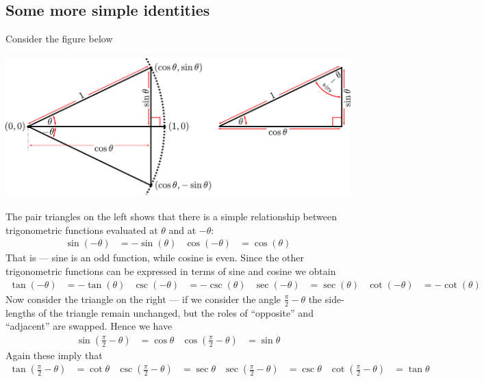 \subsection{Some more simple identities}
Consider the figure below
\begin{center}
 \includegraphics[height=55mm]{trig_defn4}
\end{center}
The pair triangles on the left shows that there is a simple relationship between
trigonometric functions evaluated at $\theta$ and at $-\theta$:
\begin{align*}
  \sin(-\theta)&=-\sin(\theta) & \cos(-\theta) &=\cos(\theta)
\end{align*}
That is --- sine is an odd function, while cosine is even. Since the other trigonometric
functions can be expressed in terms of sine and cosine we obtain
\begin{align*}
  \tan(-\theta) &=-\tan(\theta) &
  \csc(-\theta) &=-\csc(\theta) &
  \sec(-\theta) &=\sec(\theta) &
  \cot(-\theta) &=-\cot(\theta)
\end{align*}
Now consider the triangle on the right --- if we consider the angle
$\frac{\pi}{2}-\theta$ the side-lengths of the triangle remain unchanged, but the roles
of ``opposite'' and ``adjacent'' are swapped. Hence we have
\begin{align*}
\sin\left(\tfrac{\pi}{2}-\theta\right)&=\cos\theta &
\cos\left(\tfrac{\pi}{2}-\theta\right)&=\sin\theta
\end{align*}
Again these imply that
\begin{align*}
\tan\left(\tfrac{\pi}{2}-\theta\right)&=\cot\theta &
\csc\left(\tfrac{\pi}{2}-\theta\right)&=\sec\theta &
\sec\left(\tfrac{\pi}{2}-\theta\right)&=\csc\theta &
\cot\left(\tfrac{\pi}{2}-\theta\right)&=\tan\theta
\end{align*}

